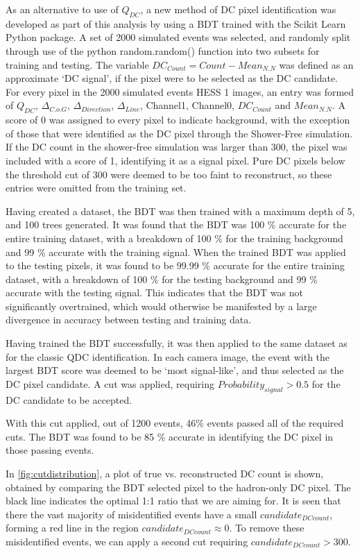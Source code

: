 \documentclass[]{article}
\begin{document}
As an alternative to use of $Q_{DC}$, a new method of DC pixel identification was developed as part of this analysis by using a BDT trained with the Scikit Learn Python package. A set of 2000 simulated events was selected, and randomly split through use of the python random.random() function into two subsets for training and testing. The variable $DC_{Count} = Count-Mean_{N.N}$ was defined as an approximate \textquoteleft DC signal', if the pixel were to be selected as the DC candidate. For every pixel in the 2000 simulated events HESS 1 images, an entry was formed of $Q_{DC}$, $ \Delta_{C.o.G}$, $\Delta_{Direction}$, $\Delta_{Line}$, Channel1, Channel0, $DC_{Count}$ and $Mean_{N.N}$. A score of 0 was assigned to every pixel to indicate background, with the exception of those that were identified as the DC pixel through the Shower-Free simulation. If the DC count in the shower-free simulation was larger than 300, the pixel was included with a score of 1, identifying it as a signal pixel. Pure DC pixels below the threshold cut of 300 were deemed to be too faint to reconstruct, so these entries were omitted from the training set.

Having created a dataset, the BDT was then trained with a maximum depth of 5, and 100 trees generated. It was found that the BDT was 100 \% accurate for the entire training dataset, with a breakdown of 100 \% for the training background and 99 \% accurate with the training signal. When the trained BDT was applied to the testing pixels, it was found to be 99.99 \%  accurate for the entire training dataset, with a breakdown of 100 \% for the testing background and 99 \% accurate with the testing signal. This indicates that the BDT was not significantly overtrained, which would otherwise be manifested by a large divergence in accuracy between testing and training data.

Having trained the BDT successfully, it was then applied to the same dataset as for the classic QDC identification. In each camera image, the event with the largest BDT score was deemed to be \textquoteleft most signal-like', and thus selected as the DC pixel candidate. A cut was applied, requiring $Probability_{signal} > 0.5$ for the DC candidate to be accepted. 

With this cut applied, out of 1200 events, 46\% events passed all of the required cuts. The BDT was found to be 85 \% accurate in identifying the DC pixel in those passing events.

In \ref{fig:cutdistribution}, a plot of true vs. reconstructed DC count is shown, obtained by comparing the BDT selected pixel to the hadron-only DC pixel. The black line indicates the optimal 1:1 ratio that we are aiming for. It is seen that there the vast majority of misidentified events have a small $candidate_{DC count}$, forming a red line in the region $candidate_{DC count} \approx 0$. To remove these misidentified events, we can apply a second cut requiring $candidate_{DC count} > 300$.
\end{document}
